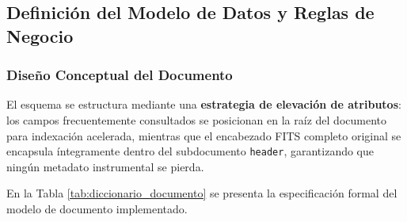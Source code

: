 \documentclass[10pt]{article}
\begin{document}
\subsection{Definición del Modelo de Datos y Reglas de Negocio}

\subsubsection{Diseño Conceptual del Documento}
El esquema se estructura mediante una \textbf{estrategia de elevación de atributos}: los campos frecuentemente consultados se posicionan en la raíz del documento para indexación acelerada, mientras que el encabezado FITS completo original se encapsula íntegramente dentro del subdocumento \texttt{header}, garantizando que ningún metadato instrumental se pierda.

En la Tabla \ref{tab:diccionario_documento} se presenta la especificación formal del modelo de documento implementado.
\end{document}
